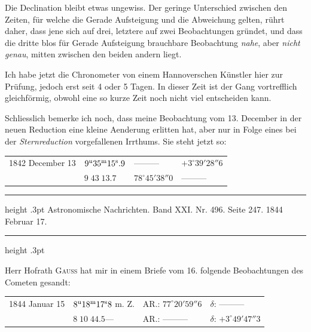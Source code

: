 Die Declination bleibt etwas ungewiss. Der geringe Unterschied zwischen den Zeiten, für welche die Gerade Aufsteigung und die Abweichung gelten, rührt daher, dass jene sich auf drei, letztere auf zwei Beobachtungen gründet, und dass die dritte blos für Gerade Aufsteigung brauchbare Beobachtung \emph{nahe}, aber \emph{nicht genau}, mitten zwischen den beiden andern liegt.

Ich habe jetzt die Chronometer von einem Hannoverschen Künstler hier zur Prüfung, jedoch erst seit 4 oder 5 Tagen. In dieser Zeit ist der Gang vortrefflich gleichförmig, obwohl eine so kurze Zeit noch nicht viel entscheiden kann.

Schliesslich bemerke ich noch, dass meine Beobachtung vom 13. December in der neuen Reduction eine kleine Aenderung erlitten hat, aber nur in Folge eines bei der \emph{Sternreduction} vorgefallenen Irrthums. Sie steht jetzt so:
\begin{center}
\begin{tabular}{l|l|l|l}
1842 December 13 & $9^{\rm u}35^{\rm m}15^{\rm s}.9$ & ---\quad ---\quad --- & $+3^\circ39'28''6$ \\
 & $9\;43\;13.7$ & $78^\circ45'38''0$ & ---\quad ---\quad --- \\
\end{tabular}
\end{center}

\par\bigskip
{}
\hypertarget{native-470-report}{}
\begin{center}
\parbox{.77\linewidth}{%
\centering\small
\hrule height .3pt\relax\vspace{2.5pt}
Astronomische Nachrichten. Band XXI. Nr. 496. Seite 247. 1844 Februar 17.\par
\vspace{2.5pt}\hrule height .3pt\relax
}
\end{center}

Herr Hofrath \textsc{Gauss} hat mir in einem Briefe vom 16. folgende Beobachtungen des Cometen gesandt:
\begin{center}
\begin{tabular}{l|l|l|l}
1844 Januar 15 & $8^{\rm u}18^{\rm m}17^{\rm s}8$ m. Z. & AR.: $77^\circ20'59''6$ & $\delta$: ---\quad ---\quad --- \\
 & $8\;10\;44.5$\quad --- & AR.: ---\quad ---\quad --- & $\delta$: $+3^\circ49'47''3$ \\
\end{tabular}
\end{center}

